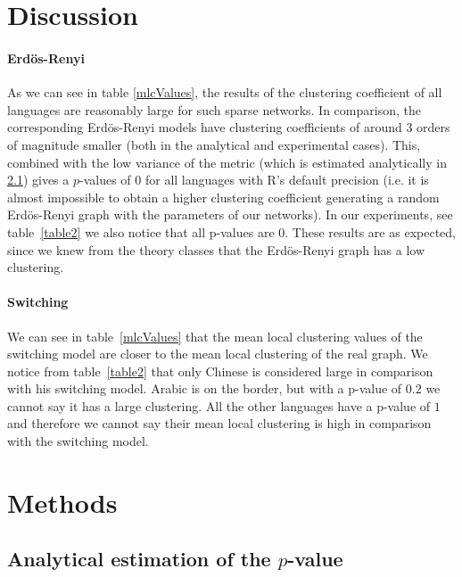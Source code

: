 \documentclass[paper=a4, fontsize=11pt]{scrartcl} %
\begin{document}
\section{Discussion}
\paragraph{Erdös-Renyi}
As we can see in table \ref{mlcValues}, the results of the clustering coefficient of all languages are reasonably large for such sparse networks. In comparison, the corresponding Erdös-Renyi models have clustering coefficients of around 3 orders of magnitude smaller (both in the analytical and experimental cases). This, combined with the low variance of the metric (which is estimated analytically in \ref{analytical}) gives a $p$-values of 0 for all languages with R's default precision (i.e. it is almost impossible to obtain a higher clustering coefficient generating a random Erdös-Renyi graph with the parameters of our networks). In our experiments, see table~\ref{table2} we also notice that all p-values are $0$.
These results are as expected, since we knew from the theory classes that the Erdös-Renyi graph has a low clustering.

\paragraph{Switching}
We can see in table~\ref{mlcValues} that the mean local clustering values of the switching model are closer to the mean local clustering of the real graph. We notice from table~\ref{table2} that only Chinese is considered large in comparison with his switching model. Arabic is on the border, but with a p-value of $0.2$ we cannot say it has a large clustering. All the other languages have a p-value of $1$ and therefore we cannot say their mean local clustering is high in comparison with the switching model.





\section{Methods}

\subsection{Analytical estimation of the $p$-value} \label{analytical}
\end{document}
